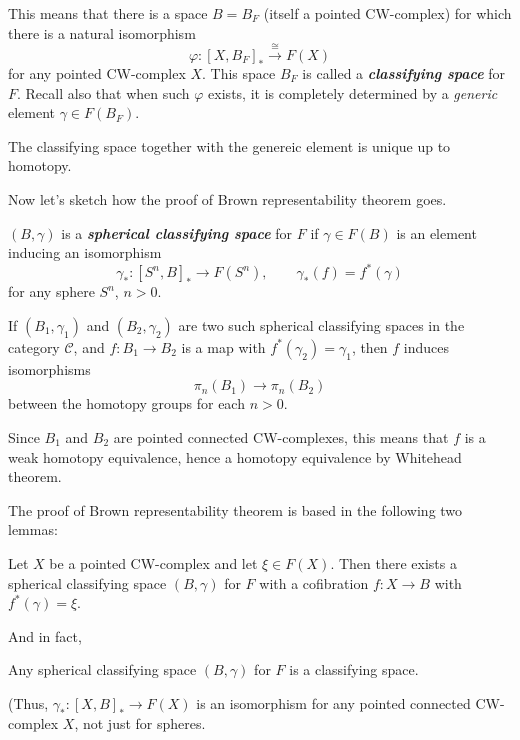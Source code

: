 \begin{remark}
\begin{defn}
\begin{remark}
	This means that there is a space $B=B_{F}$ (itself a pointed CW-complex) for which there is a natural isomorphism
	\[\varphi :[X,B_{F}]_{*}\overset{\cong }{\longrightarrow}F(X)\]
	for any pointed CW-complex $X$. This space $B_{F}$ is called a \textit{\textbf{classifying space}} for $F$. Recall also that when such $\varphi$ exists, it is completely determined by a \textit{generic} element $\gamma\in F(B_{F})$.

	The classifying space together with the genereic element is unique up to homotopy.
\end{remark}

Now let's sketch how the proof of Brown representability theorem goes.

\begin{defn}
	$(B,\gamma)$ is a \textit{\textbf{spherical classifying space}} for $F$ if $\gamma\in F(B)$ is an element inducing an isomorphism
	\[\gamma_{*}:[S^{n},B]_{*}\to F(S^{n}),\qquad \gamma_{*}(f)=f^{*} (\gamma)\]
	for any sphere $S^{n}$, $n>0$.
\end{defn}

\begin{remark}
	If $(B_{1},\gamma_{1})$ and $(B_{2},\gamma_{2})$ are two such spherical classifying spaces in the category $\mathcal{C}$, and $f:B_{1}\to B_{2}$ is a map with $f^{*} (\gamma_{2})=\gamma_{1}$, then $f$ induces isomorphisms
	\[\pi_{n}(B_{1})\to \pi_{n}(B_{2})\]
	between the homotopy groups for each $n>0$.

	Since $B_{1}$ and $B_{2}$ are pointed connected CW-complexes, this means that $f$ is a weak homotopy equivalence, hence a homotopy equivalence by Whitehead theorem.
\end{remark}

The proof of Brown representability theorem is based in the following two lemmas:

\begin{lemma}
	Let $X$ be a pointed CW-complex and let $\xi \in F(X)$. Then there exists a spherical classifying space $(B,\gamma)$ for $F$ with a cofibration  $f:X\to B$ with $f^{*} (\gamma)=\xi$.
\end{lemma}

And in fact,

\begin{lemma}
	Any spherical classifying space $(B,\gamma)$ for $F$ is a classifying space.

	(Thus, $\gamma_{*}:[X,B]_{*}\to F(X)$ is an isomorphism for any pointed connected CW-complex $X$, not just for spheres.
\end{lemma}


\end{defn}
\end{remark}
